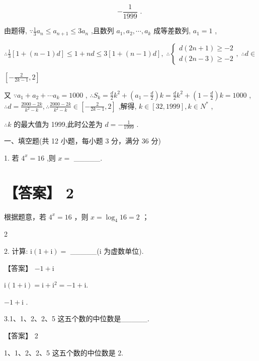 \documentclass[10pt]{article}
\begin{document}
\[
- \frac{1}{1999}\text{ . }
\]

由题得, \(\because \frac{1}{3}{a}_{n} \leq  {a}_{n + 1} \leq  3{a}_{n}\) ,且数列 \({a}_{1},{a}_{2},\cdots ,{a}_{k}\) 成等差数列, \({a}_{1} = 1\) ,

\(\therefore \frac{1}{3}\left\lbrack  {1 + \left( {n - 1}\right) d}\right\rbrack   \leq  1 + {nd} \leq  3\left\lbrack  {1 + \left( {n - 1}\right) d}\right\rbrack  ,\;\therefore \left\{  {\begin{array}{l} d\left( {{2n} + 1}\right)  \geq   - 2 \\  d\left( {{2n} - 3}\right)  \geq   - 2 \end{array},\;\therefore d \in  }\right.\)

\(\left\lbrack  {-\frac{2}{{2k} - 1},2}\right\rbrack\)

又 \(\because {a}_{1} + {a}_{2} + \cdots {a}_{k} = {1000}\) , \(\therefore {S}_{k} = \frac{d}{2}{k}^{2} + \left( {{a}_{1} - \frac{d}{2}}\right) k = \frac{d}{2}{k}^{2} + \left( {1 - \frac{d}{2}}\right) k = {1000}\) , \(\therefore d = \frac{{2000} - {2k}}{{k}^{2} - k},\therefore \frac{{2000} - {2k}}{{k}^{2} - k} \in  \left\lbrack  {-\frac{2}{{2k} - 1},2}\right\rbrack\) ,解得, \(k \in  \left\lbrack  {{32},{1999}}\right\rbrack  ,k \in  {N}^{ * }\) ,

\(\therefore k\) 的最大值为 1999,此时公差为 \(d =  - \frac{1}{1999}\) .

一、填空题(共 12 小题，每小题 3 分，满分 36 分)

1. 若 \({4}^{x} = {16}\) ,则 \(x =\) \_\_\_\_\_.

\section*{【答案】 2}

根据题意，若 \({4}^{x} = {16}\) ，则 \(x = {\log }_{4}{16} = 2\) ；

2

2. 计算: \(\mathrm{i}\left( {1 + \mathrm{i}}\right)  =\) \_\_\_\_\_(i 为虚数单位).

【答案】 \(- 1 + \mathrm{i}\)

\(\mathrm{i}\left( {1 + \mathrm{i}}\right)  = \mathrm{i} + {\mathrm{i}}^{2} =  - 1 + \mathrm{i}.\)

\(- 1 + \mathrm{i}\) .

3.1、1、2、2、5 这五个数的中位数是\_\_\_\_\_.

【答案】 2

1、1、2、2、5 这五个数的中位数是 2.
\end{document}
